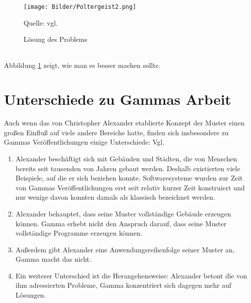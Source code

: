 \documentclass[fontsize=11pt,a4paper,final]{scrreprt}[2003/01/01]
\newcommand*{\quelle}{%
	\footnotesize Quelle: 
}
\begin{document}
\begin{figure}[H]
	\centering
	\texttt{[image: Bilder/Poltergeist2.png]}
	\caption{Lösung des Problems}
	\quelle{vgl. \cite[S. 61]{Brown1998}}
	\label{fig:Poltergeist2}
\end{figure} \ \\
Abbildung \ref{fig:Poltergeist2} zeigt, wie man es besser machen sollte.

\section{Unterschiede zu Gammas Arbeit}
Auch wenn das von Christopher Alexander etablierte Konzept der Muster einen großen Einfluß auf viele andere Bereiche hatte, finden sich insbesondere zu Gammas Veröffentlichungen einige Unterschiede: Vgl. \cite[S. 438 - 439]{gamma2004}

\begin{enumerate} 
\item Alexander beschäftigt sich mit Gebäuden und Städten, die von Menschen bereits seit tausenden von Jahren gebaut werden. Deshalb existierten viele Beispiele, auf die er sich beziehen konnte. Softwaresysteme wurden zur Zeit von Gammas Veröffentlichungen erst seit relativ kurzer Zeit konstruiert und nur wenige davon konnten damals als klassisch bezeichnet werden.
\item Alexander behauptet, dass seine Muster vollständige Gebäude erzeugen können. Gamma erhebt nicht den Anspruch darauf, dass seine Muster vollständige Programme erzeugen können.
\item Außerdem gibt Alexander eine Anwendungsreihenfolge seiner Muster an, Gamma macht das nicht.
\item Ein weiterer Unterschied ist die Herangehensweise: Alexander betont die von ihm adressierten Probleme, Gamma konzentriert sich dagegen mehr auf Lösungen.
\end{enumerate}
\end{document}
